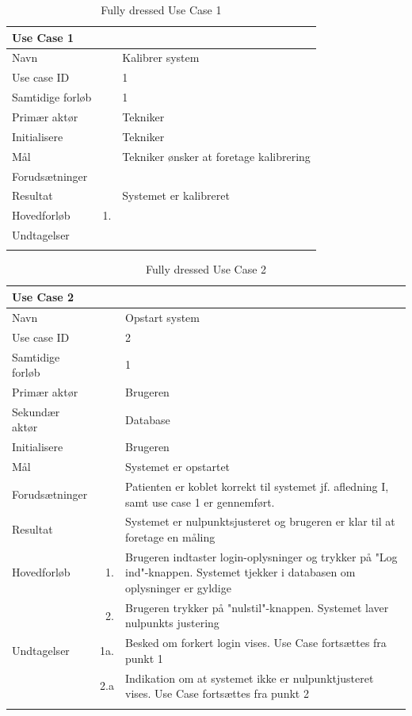 \begin{longtabu} to  %
    {\large \textbf{Use Case 1}} && \\
    \toprule
    Navn &&    Kalibrer system\\
    Use case ID &&    1\\
    Samtidige forløb &&    1\\
    Primær aktør &&    Tekniker\\
    Initialisere &&    Tekniker\\
    Mål && Tekniker ønsker at foretage kalibrering\\
    Forudsætninger &&  \\
    Resultat &&    Systemet er kalibreret                     \\ \midrule
    Hovedforløb &    1. &      \\ \midrule
                
    Undtagelser &    &    \\ \bottomrule
\caption{Fully dressed Use Case 1}
\label{UC1}
\end{longtabu}

\begin{longtabu} to  %
    {\large \textbf{Use Case 2}} && \\
    \toprule
    Navn &&    Opstart system\\
    Use case ID &&    2\\
    Samtidige forløb &&    1\\
    Primær aktør &&    Brugeren\\
    Sekundær aktør && Database\\
    Initialisere &&    Brugeren\\
    Mål && Systemet er opstartet\\
    Forudsætninger &&  Patienten er koblet korrekt til systemet jf. afledning I, samt use case 1 er gennemført.\\
    Resultat &&    Systemet er nulpunktsjusteret og brugeren er klar til at foretage en måling\\
    \midrule
    Hovedforløb &    1. &    Brugeren indtaster login-oplysninger og trykker på "Log ind"\--knappen. Systemet tjekker i databasen om oplysninger er gyldige \\
    	&			2. & Brugeren trykker på "nulstil"\--knappen. Systemet laver nulpunkts justering  \\ \midrule
    Undtagelser &    1a. & Besked om forkert login vises. Use Case fortsættes fra punkt 1     \\ 
    	&			2.a & Indikation om at systemet ikke er nulpunktjusteret vises. Use Case fortsættes fra punkt 2 \\ \bottomrule    
\caption{Fully dressed Use Case 2}
\label{UC2}
\end{longtabu}



